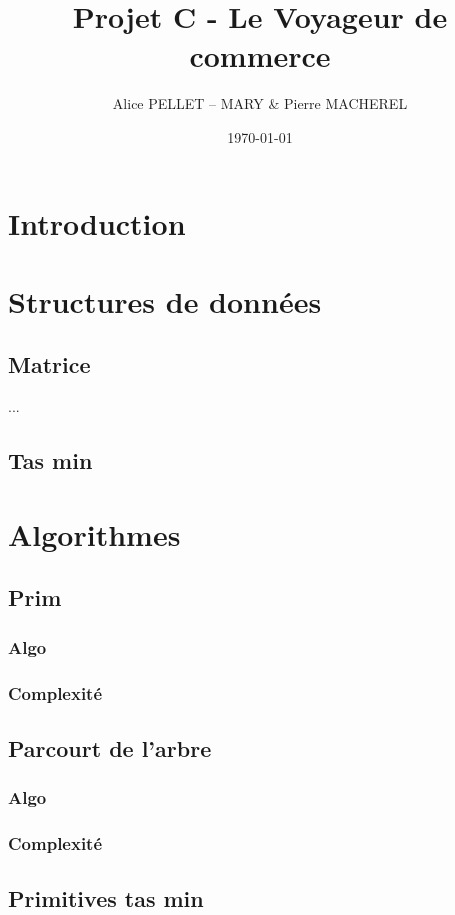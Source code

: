 \documentclass[a4paper,11pt]{article}
\date{\today}
\title{Projet C - Le Voyageur de commerce}
\author{Alice PELLET -- MARY \& Pierre MACHEREL}
\begin{document}
\maketitle
\tableofcontents

\section*{Introduction} %

\section{Structures de données}

\subsection{Matrice} %
...

\subsection{Tas min} %


\section{Algorithmes}

\subsection{Prim} %
\subsubsection*{Algo}
\subsubsection*{Complexité}

\subsection{Parcourt de l'arbre} %
\subsubsection*{Algo}
\subsubsection*{Complexité}

\subsection{Primitives tas min} %
\end{document}
